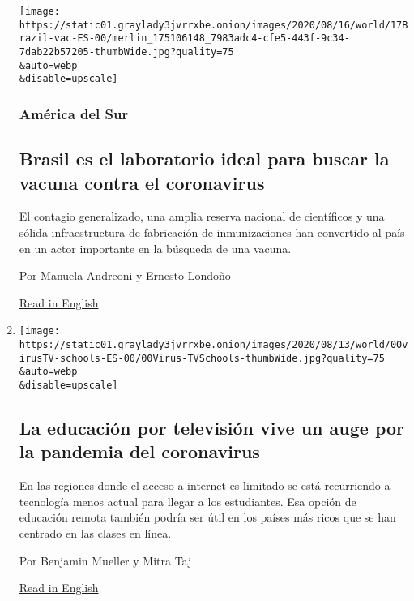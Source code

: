 \begin{enumerate}
  \texttt{[image: https://static01.graylady3jvrrxbe.onion/images/2020/08/16/world/17Brazil-vac-ES-00/merlin\_175106148\_7983adc4-cfe5-443f-9c34-7dab22b57205-thumbWide.jpg?quality=75\\\&auto=webp\\\&disable=upscale]}

  \hypertarget{amuxe9rica-del-sur}{%
  \subsubsection{América del Sur}\label{amuxe9rica-del-sur}}

  \hypertarget{brasil-es-el-laboratorio-ideal-para-buscar-la-vacuna-contra-el-coronavirus}{%
  \subsection{Brasil es el laboratorio ideal para buscar la vacuna
  contra el
  coronavirus}\label{brasil-es-el-laboratorio-ideal-para-buscar-la-vacuna-contra-el-coronavirus}}

  El contagio generalizado, una amplia reserva nacional de científicos y
  una sólida infraestructura de fabricación de inmunizaciones han
  convertido al país en un actor importante en la búsqueda de una
  vacuna.

  Por Manuela Andreoni y Ernesto Londoño

  \href{https://www.nytimes3xbfgragh.onion/2020/08/15/world/americas/brazil-coronavirus-vaccine.html}{Read
  in English}
\item
  \href{/es/2020/08/17/espanol/educacion-television.html}{}

  \texttt{[image: https://static01.graylady3jvrrxbe.onion/images/2020/08/13/world/00virusTV-schools-ES-00/00Virus-TVSchools-thumbWide.jpg?quality=75\\\&auto=webp\\\&disable=upscale]}

  \hypertarget{la-educaciuxf3n-por-televisiuxf3n-vive-un-auge-por-la-pandemia-del-coronavirus}{%
  \subsection{La educación por televisión vive un auge por la pandemia
  del
  coronavirus}\label{la-educaciuxf3n-por-televisiuxf3n-vive-un-auge-por-la-pandemia-del-coronavirus}}

  En las regiones donde el acceso a internet es limitado se está
  recurriendo a tecnología menos actual para llegar a los estudiantes.
  Esa opción de educación remota también podría ser útil en los países
  más ricos que se han centrado en las clases en línea.

  Por Benjamin Mueller y Mitra Taj

  \href{https://www.nytimes3xbfgragh.onion/2020/08/17/world/coronavirus-television-schools.html}{Read
  in English}
\end{enumerate}

